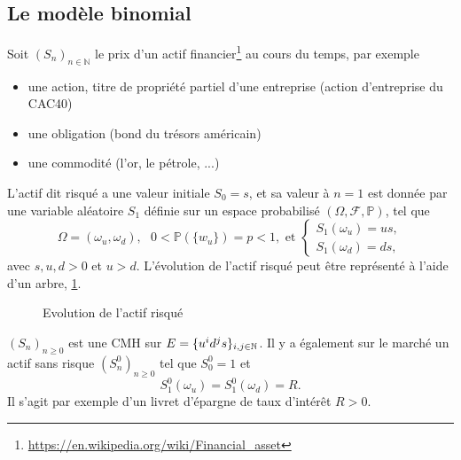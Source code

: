
\subsection{Le modèle binomial}\label{sec:binomial_modele}
Soit $(S_n)_{n\in\mathbb{N}}$ le prix d'un actif financier\footnote{\url{https://en.wikipedia.org/wiki/Financial_asset}} au cours du temps, par exemple 
\begin{itemize}
    \item une action, titre de propriété partiel d'une entreprise (action d'entreprise du CAC40)
    \item une obligation (bond du trésors américain) 
    \item une commodité (l'or, le pétrole, ...)
\end{itemize} 
L'actif dit risqué a une valeur initiale $S_0 = s$, et sa valeur à $n= 1$ est donnée par une variable aléatoire $S_1$ définie sur un espace probabilisé $(\Omega, \mathcal{F}, \mathbb{P})$, tel que 
$$
\Omega = (\omega_u,\omega_d),\text{ }0<\mathbb{P}(\{w_u\}) = p<1,\text{ et }\begin{cases}
S_1(\omega_u) = us,\\
S_1(\omega_d) = ds,
\end{cases}
$$
avec $s,u,d>0$ et $u>d$. L'évolution de l'actif risqué peut être représenté à l'aide d'un arbre, \cf \cref{fig:actif_risk}.
\begin{figure}[h!]
\begin{center}
\caption{Evolution de l'actif risqué}
\label{fig:actif_risk}
\end{center}
\end{figure}
$(S_n)_{n\geq0}$ est une CMH sur $E = \{u^id^js\}_{i,j\in\mathbb{N}}$. Il y a également sur le marché un actif sans risque $(S^0_n)_{n\geq0}$ tel que $S^0_0 = 1$ et 
$$
S^0_1(\omega_u) = S^0_1(\omega_d) = R.
$$
Il s'agit par exemple d'un livret d'épargne de taux d'intérêt $R>0$.\\

